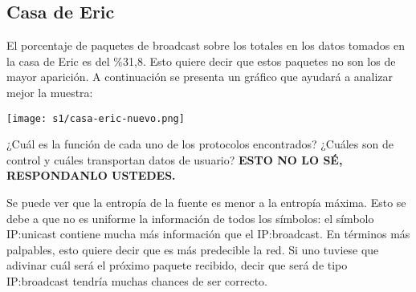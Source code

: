 

\subsection{Casa de Eric}
El porcentaje de paquetes de broadcast sobre los totales en los datos tomados en la 
casa de Eric es del \%31,8. Esto quiere decir que estos paquetes no son los de 
mayor aparición. A continuación se presenta un gráfico que ayudará a analizar mejor
la muestra:

\texttt{[image: s1/casa-eric-nuevo.png]}


¿Cuál es la función de cada uno de los protocolos encontrados? 
¿Cuáles son de control y cuáles transportan datos de usuario? 
\textbf{ESTO NO LO SÉ, RESPONDANLO USTEDES.}


Se puede ver que la entropía de la fuente es menor a la entropía máxima. Esto
se debe a que no es uniforme la información de todos los símbolos: el símbolo
IP:unicast contiene mucha más información que el IP:broadcast. En términos más
palpables, esto quiere decir que es más predecible la red. Si uno tuviese que
adivinar cuál será el próximo paquete recibido, decir que será de tipo
IP:broadcast tendría muchas chances de ser correcto.



